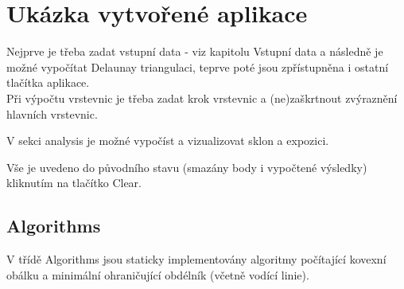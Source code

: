 \documentclass[a4paper, 12pt]{article}
\begin{document}
\clearpage

\section{Ukázka vytvořené aplikace}



Nejprve je třeba zadat vstupní data - viz kapitolu Vstupní data a následně je možné vypočítat Delaunay triangulaci, teprve poté jsou zpřístupněna i ostatní tlačítka aplikace. \\


Při výpočtu vrstevnic je třeba zadat krok vrstevnic a (ne)zaškrtnout zvýraznění hlavních vrstevnic.


V sekci analysis je možné vypočíst a vizualizovat sklon a expozici.


Vše je uvedeno do původního stavu (smazány body i vypočtené výsledky) kliknutím na tlačítko Clear.\\
\clearpage





\clearpage




\subsection{Algorithms}
V třídě Algorithms jsou staticky implementovány algoritmy počítající kovexní obálku a minimální ohraničující obdélník (včetně vodící linie).
\end{document}
